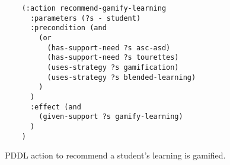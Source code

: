 \begin{figure}[t]
    \begin{lstlisting}
    (:action recommend-gamify-learning
      :parameters (?s - student)
      :precondition (and
        (or
          (has-support-need ?s asc-asd)
          (has-support-need ?s tourettes)
          (uses-strategy ?s gamification)
          (uses-strategy ?s blended-learning)
        )
      )
      :effect (and 
        (given-support ?s gamify-learning)
      )
    )
    \end{lstlisting}
    \caption{PDDL action to recommend a student's learning is gamified.}\label{fig:pddl-action-gamify-learning}
\end{figure}